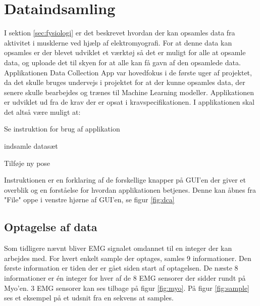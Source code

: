 \thispagestyle{fancy}
\chapter{Dataindsamling}
\label{chp:dataingsamlingChapter}
I sektion \ref{sec:fysiologi} er det beskrevet hvordan der kan opsamles data fra aktivitet i musklerne ved hjælp af elektromyografi. For at denne data kan opsamles er der blevet udviklet et værktøj så det er muligt for alle at opsamle data, og uploade det til skyen for at alle kan få gavn af den opsamlede data. Applikationen Data Collection App var hovedfokus i de første uger af projektet, da det skulle bruges undervejs i projektet for at der kunne opsamles data, der senere skulle bearbejdes og trænes til Machine Learning modeller. Applikationen er udviklet ud fra de krav der er opsat i kravspecifikationen\citep{RefWorks:8}. I applikationen skal det altså være muligt at:
\begin{myItemize}
	\item Se instruktion for brug af applikation
	\item indsamle datasæt
	\item Tilføje ny pose
\end{myItemize}
Instruktionen er en forklaring af de forskellige knapper på GUI'en der giver et overblik og en forståelse for hvordan applikationen betjenes. Denne kan åbnes fra "File" oppe i venstre hjørne af GUI'en, se figur \ref{fig:dca} 

\section{Optagelse af data}
\label{sec:optagelsedata}
Som tidligere nævnt bliver EMG signalet omdannet til en integer der kan arbejdes med. For hvert enkelt sample der optages, samles 9 informationer. Den første information er tiden der er gået siden start af optagelsen. De næste 8 informationer er én integer for hver af de 8 EMG sensorer der sidder rundt på Myo'en. 3 EMG sensorer kan ses tilbage på figur \ref{fig:myo}.
På figur \ref{fig:sample} ses et eksempel på et udsnit fra en sekvens at samples.


